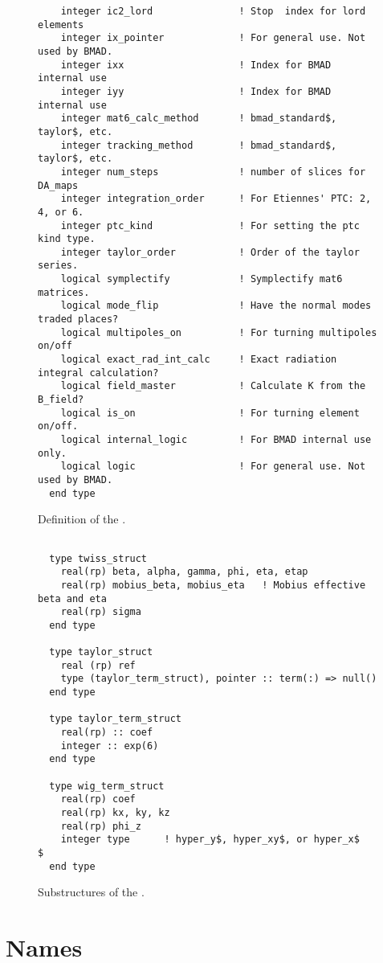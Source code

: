 {\begin{figure}[tb]
\begin{verbatim}
    integer ic2_lord               ! Stop  index for lord elements
    integer ix_pointer             ! For general use. Not used by BMAD.
    integer ixx                    ! Index for BMAD internal use
    integer iyy                    ! Index for BMAD internal use
    integer mat6_calc_method       ! bmad_standard$, taylor$, etc.
    integer tracking_method        ! bmad_standard$, taylor$, etc.
    integer num_steps              ! number of slices for DA_maps
    integer integration_order      ! For Etiennes' PTC: 2, 4, or 6.
    integer ptc_kind               ! For setting the ptc kind type.
    integer taylor_order           ! Order of the taylor series.
    logical symplectify            ! Symplectify mat6 matrices.
    logical mode_flip              ! Have the normal modes traded places?
    logical multipoles_on          ! For turning multipoles on/off
    logical exact_rad_int_calc     ! Exact radiation integral calculation?
    logical field_master           ! Calculate K from the B_field?
    logical is_on                  ! For turning element on/off.
    logical internal_logic         ! For BMAD internal use only.
    logical logic                  ! For general use. Not used by BMAD.
  end type
\end{verbatim}
\caption{Definition of the .}
\label{f:ele_struct}
\end{figure}

\begin{figure}[tb]
\centering
\begin{verbatim}

  type twiss_struct
    real(rp) beta, alpha, gamma, phi, eta, etap
    real(rp) mobius_beta, mobius_eta   ! Mobius effective beta and eta
    real(rp) sigma
  end type

  type taylor_struct
    real (rp) ref
    type (taylor_term_struct), pointer :: term(:) => null()
  end type

  type taylor_term_struct
    real(rp) :: coef
    integer :: exp(6)
  end type

  type wig_term_struct
    real(rp) coef
    real(rp) kx, ky, kz
    real(rp) phi_z
    integer type      ! hyper_y$, hyper_xy$, or hyper_x$     $
  end type

\end{verbatim}
\caption{Substructures of the .}
\label{f:subele_struct}
\end{figure}

\section{Names}

}
